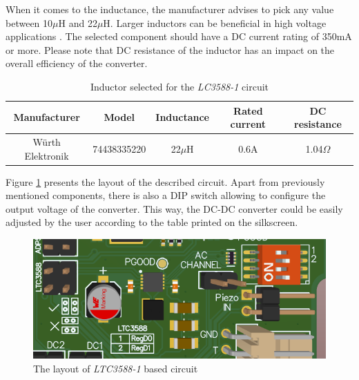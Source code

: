 \documentclass[12pt,a4paper]{article}
\begin{document}
When it comes to the inductance, the manufacturer advises to pick any value between 10$\mu$H and 22$\mu$H. Larger inductors can be beneficial in high voltage applications \cite{ltc3588_params}. The selected component should have a DC current rating of 350mA or more. Please note that DC resistance of the inductor has an impact on the overall efficiency of the converter.

\begin{table}[ht!]
\begin{tabular}{|c|c|c|c|c|}
\hline
\textbf{Manufacturer} & \textbf{Model} & \textbf{Inductance} & \textbf{Rated current} & \textbf{DC resistance}	\\ \hline
 Würth Elektronik & 74438335220 & 22$\mu$H & 0.6A & 1.04$\Omega$      \\ \hline

\end{tabular}
\caption{Inductor selected for the \textit{LC3588-1} circuit \cite{ltc3588_inductor_params}}
\label{tab:ltc3588_inductor}
\end{table}

\par

Figure \ref{fig:ltc3588layout} presents the layout of the described circuit. Apart from previously mentioned components, there is also a DIP switch allowing to configure the output voltage of the converter. This way, the DC-DC converter could be easily adjusted by the user according to the table printed on the silkscreen.

\begin{figure}[ht!]
\includegraphics[scale=0.7]{ltc3588_layout.png}
\caption{The layout of \textit{LTC3588-1} based circuit}
\label{fig:ltc3588layout}
\end{figure}
\end{document}
